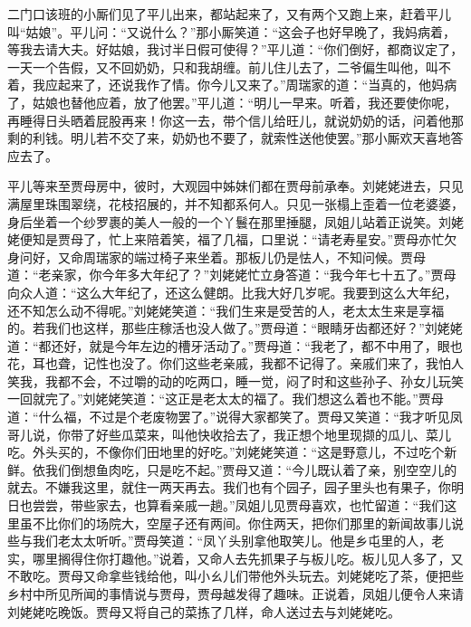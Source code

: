 \documentclass[12pt,oneside]{book}
\begin{document}
二门口该班的小厮们见了平儿出来，都站起来了，又有两个又跑上来，赶着平儿叫“姑娘”。平儿问：“又说什么？”那小厮笑道：“这会子也好早晚了，我妈病着，等我去请大夫。好姑娘，我讨半日假可使得？”平儿道：“你们倒好，都商议定了，一天一个告假，又不回奶奶，只和我胡缠。前儿住儿去了，二爷偏生叫他，叫不着，我应起来了，还说我作了情。你今儿又来了。”周瑞家的道：“当真的，他妈病了，姑娘也替他应着，放了他罢。”平儿道：“明儿一早来。听着，我还要使你呢，再睡得日头晒着屁股再来！你这一去，带个信儿给旺儿，就说奶奶的话，问着他那剩的利钱。明儿若不交了来，奶奶也不要了，就索性送他使罢。”那小厮欢天喜地答应去了。

平儿等来至贾母房中，彼时，大观园中姊妹们都在贾母前承奉。刘姥姥进去，只见满屋里珠围翠绕，花枝招展的，并不知都系何人。只见一张榻上歪着一位老婆婆，身后坐着一个纱罗裹的美人一般的一个丫鬟在那里捶腿，凤姐儿站着正说笑。刘姥姥便知是贾母了，忙上来陪着笑，福了几福，口里说：“请老寿星安。”贾母亦忙欠身问好，又命周瑞家的端过椅子来坐着。那板儿仍是怯人，不知问候。贾母道：“老亲家，你今年多大年纪了？”刘姥姥忙立身答道：“我今年七十五了。”贾母向众人道：“这么大年纪了，还这么健朗。比我大好几岁呢。我要到这么大年纪，还不知怎么动不得呢。”刘姥姥笑道：“我们生来是受苦的人，老太太生来是享福的。若我们也这样，那些庄稼活也没人做了。”贾母道：“眼睛牙齿都还好？”刘姥姥道：“都还好，就是今年左边的槽牙活动了。”贾母道：“我老了，都不中用了，眼也花，耳也聋，记性也没了。你们这些老亲戚，我都不记得了。亲戚们来了，我怕人笑我，我都不会，不过嚼的动的吃两口，睡一觉，闷了时和这些孙子、孙女儿玩笑一回就完了。”刘姥姥笑道：“这正是老太太的福了。我们想这么着也不能。”贾母道：“什么福，不过是个老废物罢了。”说得大家都笑了。贾母又笑道：“我才听见凤哥儿说，你带了好些瓜菜来，叫他快收拾去了，我正想个地里现撷的瓜儿、菜儿吃。外头买的，不像你们田地里的好吃。”刘姥姥笑道：“这是野意儿，不过吃个新鲜。依我们倒想鱼肉吃，只是吃不起。”贾母又道：“今儿既认着了亲，别空空儿的就去。不嫌我这里，就住一两天再去。我们也有个园子，园子里头也有果子，你明日也尝尝，带些家去，也算看亲戚一趟。”凤姐儿见贾母喜欢，也忙留道：“我们这里虽不比你们的场院大，空屋子还有两间。你住两天，把你们那里的新闻故事儿说些与我们老太太听听。”贾母笑道：“凤丫头别拿他取笑儿。他是乡屯里的人，老实，哪里搁得住你打趣他。”说着，又命人去先抓果子与板儿吃。板儿见人多了，又不敢吃。贾母又命拿些钱给他，叫小ㄠ儿们带他外头玩去。刘姥姥吃了茶，便把些乡村中所见所闻的事情说与贾母，贾母越发得了趣味。正说着，凤姐儿便令人来请刘姥姥吃晚饭。贾母又将自己的菜拣了几样，命人送过去与刘姥姥吃。
\end{document}

